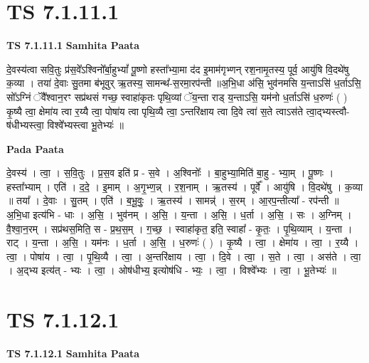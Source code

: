 \documentclass[17pt]{extarticle}
\begin{document}

\section{ TS 7.1.11.1 }

\textbf{TS 7.1.11.1 } \newline
\textbf{Samhita Paata} \newline

दे॒वस्य॑त्वा सवि॒तुः प्र॑स॒वे᳚ऽश्विनो᳚र्बा॒हुभ्यां᳚ पू॒ष्णो हस्ता᳚भ्या॒मा द॑द इ॒माम॑गृभ्णन् रश॒नामृ॒तस्य॒ पूर्व॒ आयु॑षि वि॒दथे॑षु क॒व्या । तया॑ दे॒वाः सु॒तमा ब॑भूवुर् ऋ॒तस्य॒ सामन्थ᳚-स॒रमा॒रप॑न्ती ॥अ॒भि॒धा अ॑सि॒ भुव॑नमसि य॒न्ताऽसि॑ ध॒र्ताऽसि॒ सो᳚ऽग्निं ॅवै᳚श्वान॒रꣳ सप्र॑थसं गच्छ॒ स्वाहा॑कृतः पृथि॒व्यां ॅय॒न्ता राड् य॒न्ताऽसि॒ यम॑नो ध॒र्ताऽसि॑ ध॒रुणः॑ ( ) कृ॒ष्यै त्वा॒ क्षेमा॑य त्वा र॒य्यै त्वा॒ पोषा॑य त्वा पृथि॒व्यै त्वा॒ ऽन्तरि॑क्षाय त्वा दि॒वे त्वा॑ स॒ते त्वाऽस॑ते त्वा॒द्भ्यस्त्वौ-ष॑धीभ्यस्त्वा॒ विश्वे᳚भ्यस्त्वा भू॒तेभ्यः॑ ॥ \newline

\textbf{Pada Paata} \newline

दे॒वस्य॑ । त्वा॒ । स॒वि॒तुः । प्र॒स॒व इति॑ प्र - स॒वे । अ॒श्विनोः᳚ । बा॒हुभ्या॒मिति॑ बा॒हु - भ्या॒म् । पू॒ष्णः । हस्ता᳚भ्याम् । एति॑ । द॒दे॒ । इ॒माम् । अ॒गृ॒भ्ण॒न्न् । र॒श॒नाम् । ऋ॒तस्य॑ । पूर्वे᳚ । आयु॑षि । वि॒दथे॑षु । क॒व्या ॥ तया᳚ । दे॒वाः । सु॒तम् । एति॑ । ब॒भू॒वुः॒ । ऋ॒तस्य॑ । सामन्न्॑ । स॒रम् । आ॒रप॒न्तीत्या᳚ - रप॑न्ती ॥ अ॒भि॒धा इत्य॑भि - धाः । अ॒सि॒ । भुव॑नम् । अ॒सि॒ । य॒न्ता । अ॒सि॒ । ध॒र्ता । अ॒सि॒ । सः । अ॒ग्निम् । वै॒श्वा॒न॒रम् । सप्र॑थस॒मिति॒ स - प्र॒थ॒स॒म् । ग॒च्छ॒ । स्वाहा॑कृत॒ इति॒ स्वाहा᳚ - कृ॒तः॒ । पृ॒थि॒व्याम् । य॒न्ता । राट् । य॒न्ता । अ॒सि॒ । यम॑नः । ध॒र्ता । अ॒सि॒ । ध॒रुणः॑ ( ) । कृ॒ष्यै । त्वा॒ । क्षेमा॑य । त्वा॒ । र॒य्यै । त्वा॒ । पोषा॑य । त्वा॒ । पृ॒थि॒व्यै । त्वा॒ । अ॒न्तरि॑क्षाय । त्वा॒ । दि॒वे । त्वा॒ । स॒ते । त्वा॒ । अस॑ते । त्वा॒ । अ॒द्भ्य इत्य॑त् - भ्यः । त्वा॒ । ओष॑धीभ्य॒ इत्योष॑धि - भ्यः॒ । त्वा॒ । विश्वे᳚भ्यः । त्वा॒ । भू॒तेभ्यः॑ ॥  \newline





\section{ TS 7.1.12.1 }

\textbf{TS 7.1.12.1 } \newline
\textbf{Samhita Paata} \newline
\end{document}
